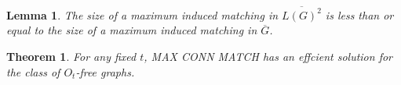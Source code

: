 \documentclass[12 pt]{article}
\newtheorem{theorem}{Theorem}
\newtheorem{lemma}{Lemma}
\begin{document}
\begin{lemma}The size of a maximum induced matching in $\overline{L(G)^2}$ is less than or equal to the size of a maximum induced matching in $\overline{G}$.
\end{lemma}

\begin{theorem}
	For any fixed $t$, MAX CONN MATCH has an effcient solution for the class of $O_t$-free graphs.
\end{theorem}
\end{document}
